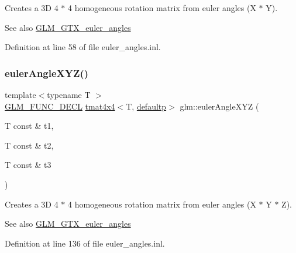 Creates a 3D 4 $\ast$ 4 homogeneous rotation matrix from euler angles (X $\ast$ Y). \begin{DoxySeeAlso}{See also}
\mbox{\hyperlink{group__gtx__euler__angles}{G\+L\+M\+\_\+\+G\+T\+X\+\_\+euler\+\_\+angles}} 
\end{DoxySeeAlso}


Definition at line 58 of file euler\+\_\+angles.\+inl.

\mbox{\label{group__gtx__euler__angles_gaaedda1657a1aebe0a904d864b33844e8}} 
\subsubsection{\texorpdfstring{eulerAngleXYZ()}{eulerAngleXYZ()}}
{\footnotesize\ttfamily template$<$typename T $>$ \\
\mbox{\hyperlink{setup_8hpp_ab2d052de21a70539923e9bcbf6e83a51}{G\+L\+M\+\_\+\+F\+U\+N\+C\+\_\+\+D\+E\+CL}} \mbox{\hyperlink{structglm_1_1tmat4x4}{tmat4x4}}$<$T, \mbox{\hyperlink{namespaceglm_a0f04f086094c747d227af4425893f545a9d21ccd8b5a009ec7eb7677befc3bf51}{defaultp}}$>$ glm\+::euler\+Angle\+X\+YZ (\begin{DoxyParamCaption}\item[{T const \&}]{t1,  }\item[{T const \&}]{t2,  }\item[{T const \&}]{t3 }\end{DoxyParamCaption})}

Creates a 3D 4 $\ast$ 4 homogeneous rotation matrix from euler angles (X $\ast$ Y $\ast$ Z). \begin{DoxySeeAlso}{See also}
\mbox{\hyperlink{group__gtx__euler__angles}{G\+L\+M\+\_\+\+G\+T\+X\+\_\+euler\+\_\+angles}} 
\end{DoxySeeAlso}


Definition at line 136 of file euler\+\_\+angles.\+inl.

\mbox{\label{group__gtx__euler__angles_gab2d7dc94b9a7519d741aaa208c7a335b}} 
